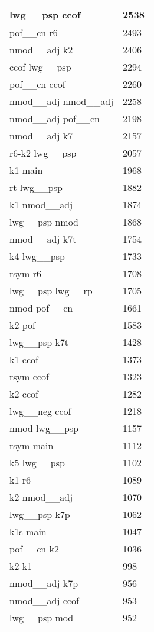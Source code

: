\documentclass[a4 paper]{article}
\begin{document}
\begin{longtable}{p{}p{}}
lwg\_\_psp ccof  & 2538 \\ \midrule
pof\_\_cn r6  & 2493 \\ \midrule
nmod\_\_adj k2  & 2406 \\ \midrule
ccof lwg\_\_psp  & 2294 \\ \midrule
pof\_\_cn ccof  & 2260 \\ \midrule
nmod\_\_adj nmod\_\_adj  & 2258 \\ \midrule
nmod\_\_adj pof\_\_cn  & 2198 \\ \midrule
nmod\_\_adj k7  & 2157 \\ \midrule
r6-k2 lwg\_\_psp  & 2057 \\ \midrule
k1 main  & 1968 \\ \midrule
rt lwg\_\_psp  & 1882 \\ \midrule
k1 nmod\_\_adj  & 1874 \\ \midrule
lwg\_\_psp nmod  & 1868 \\ \midrule
nmod\_\_adj k7t  & 1754 \\ \midrule
k4 lwg\_\_psp  & 1733 \\ \midrule
rsym r6  & 1708 \\ \midrule
lwg\_\_psp lwg\_\_rp  & 1705 \\ \midrule
nmod pof\_\_cn  & 1661 \\ \midrule
k2 pof  & 1583 \\ \midrule
lwg\_\_psp k7t  & 1428 \\ \midrule
k1 ccof  & 1373 \\ \midrule
rsym ccof  & 1323 \\ \midrule
k2 ccof  & 1282 \\ \midrule
lwg\_\_neg ccof  & 1218 \\ \midrule
nmod lwg\_\_psp  & 1157 \\ \midrule
rsym main  & 1112 \\ \midrule
k5 lwg\_\_psp  & 1102 \\ \midrule
k1 r6  & 1089 \\ \midrule
k2 nmod\_\_adj  & 1070 \\ \midrule
lwg\_\_psp k7p  & 1062 \\ \midrule
k1s main  & 1047 \\ \midrule
pof\_\_cn k2  & 1036 \\ \midrule
k2 k1  & 998 \\ \midrule
nmod\_\_adj k7p  & 956 \\ \midrule
nmod\_\_adj ccof  & 953 \\ \midrule
lwg\_\_psp mod  & 952 \\ \midrule

\end{longtable}
\end{document}
